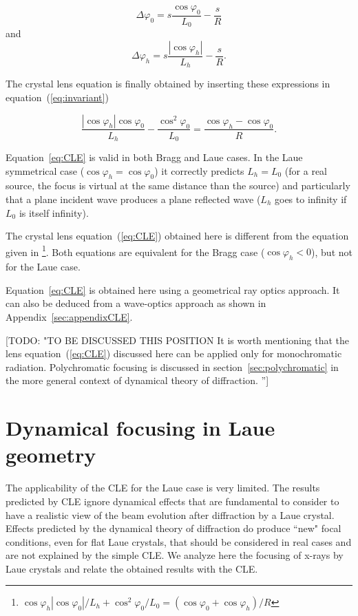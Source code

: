 \documentclass[preprint]{iucr}              %
\newcommand{\todo}[1]{{\color{red}[TODO: "#1'']}}
\newcommand{\inblue}[1]{{\color{blue}#1}}
\begin{document}
\begin{equation}
\label{angles}
\Delta \varphi_0 = s \frac{\cos\varphi_0}{L_0} - \frac{s}{R}
\end{equation}
and 
\begin{equation}
\Delta \varphi_h = s \frac{|\cos\varphi_h|}{L_h} - \frac{s}{R}.
\end{equation}

The crystal lens equation is finally obtained by inserting these expressions in equation~(\ref{eq:invariant})

\begin{equation}
\label{eq:CLE}
\frac{|\cos\varphi_h| \cos\varphi_0}{L_h} - \frac{\cos^2\varphi_0}{L_0} = \frac{\cos\varphi_h - \cos\varphi_0}{R}.
\end{equation}


Equation~\ref{eq:CLE} is valid in both Bragg and Laue cases. In the Laue symmetrical case ($\cos\varphi_h=\cos\varphi_0$) it correctly predicts $L_h=L_0$ \inblue{(for a real source, the focus is virtual at the same distance than the source)} and particularly that a plane incident wave produces a plane reflected wave ($L_h$ goes to infinity if $L_0$ is itself infinity).


The crystal lens equation~(\ref{eq:CLE}) obtained here is different from the equation given in \cite{CK}\footnote{ 
$
\cos\varphi_h |\cos\varphi_0|/L_h + \cos^2\varphi_0/L_0 = (\cos\varphi_0 + \cos\varphi_h)/R 
$}. Both equations are equivalent for the Bragg case ($\cos\varphi_h<0$), but not for the Laue case.

Equation~\ref{eq:CLE} is obtained here using a geometrical ray optics approach. It can also be deduced from a \inblue{wave-optics} approach as shown in Appendix~\ref{sec:appendixCLE}. 

\todo{TO BE DISCUSSED THIS POSITION
It is worth mentioning that the lens equation~(\ref{eq:CLE}) discussed here can be applied only for monochromatic radiation. Polychromatic focusing is discussed in section~\ref{sec:polychromatic} in the more general context of dynamical theory of diffraction. } 

\section{Dynamical focusing in Laue geometry}
\label{sec:dynamlicalLaue}

\inblue{The applicability of the CLE for the Laue case is very limited. The results predicted by CLE ignore dynamical effects that are fundamental to consider to have a realistic view of the beam evolution after diffraction by a Laue crystal. Effects predicted by the dynamical theory of diffraction do produce ``new" focal conditions, even for flat Laue crystals, that should be considered in real cases and are not explained by the simple CLE. We analyze here the focusing of x-rays by Laue crystals and relate the obtained results with the CLE. }
\end{document}
